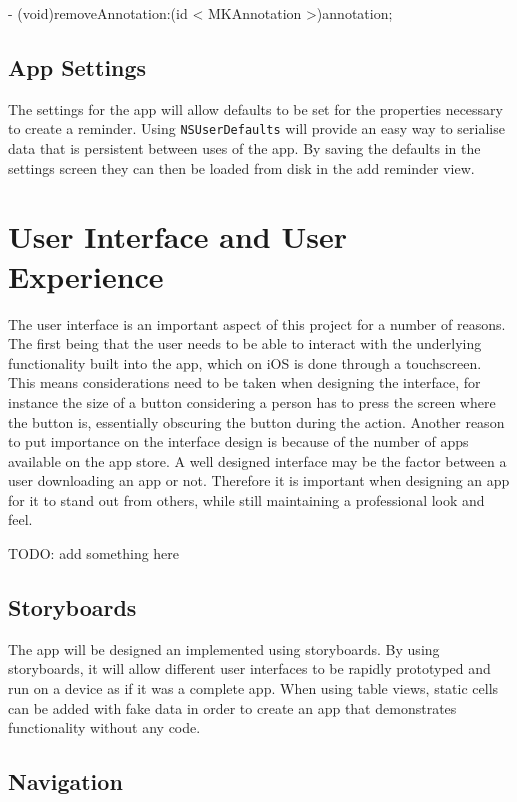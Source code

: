 \documentclass[12pt]{report}
\begin{document}
\begin{objccode}
- (void)removeAnnotation:(id < MKAnnotation >)annotation;
\end{objccode}

\subsection{App Settings}

The settings for the app will allow defaults to be set for the properties necessary to create a reminder. Using \texttt{NSUserDefaults} will provide an easy way to serialise data that is persistent between uses of the app. By saving the defaults in the settings screen they can then be loaded from disk in the add reminder view.

\section{User Interface and User Experience}

The user interface is an important aspect of this project for a number of reasons. The first being that the user needs to be able to interact with the underlying functionality built into the app, which on iOS is done through a touchscreen. This means considerations need to be taken when designing the interface, for instance the size of a button considering a person has to press the screen where the button is, essentially obscuring the button during the action. Another reason to put importance on the interface design is because of the number of apps available on the app store. A well designed interface may be the factor between a user downloading an app or not. Therefore it is important when designing an app for it to stand out from others, while still maintaining a professional look and feel.

TODO: add something here

\subsection{Storyboards}

The app will be designed an implemented using storyboards. By using storyboards, it will allow different user interfaces to be rapidly prototyped and run on a device as if it was a complete app. When using table views, static cells can be added with fake data in order to create an app that demonstrates functionality without any code. 

\subsection{Navigation}
\end{document}
